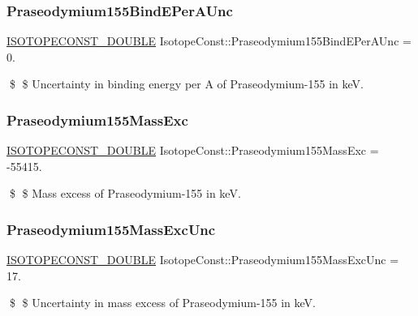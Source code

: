 \subsubsection{\texorpdfstring{Praseodymium155\+Bind\+E\+Per\+A\+Unc}{Praseodymium155BindEPerAUnc}}
{\footnotesize\ttfamily \mbox{\hyperlink{group___isotope_const-_macros_ga8f45a7272ce02c0b4c65c44636ed719a}{I\+S\+O\+T\+O\+P\+E\+C\+O\+N\+S\+T\+\_\+\+D\+O\+U\+B\+LE}} Isotope\+Const\+::\+Praseodymium155\+Bind\+E\+Per\+A\+Unc = 0.}

\$ \$ Uncertainty in binding energy per A of Praseodymium-\/155 in keV. \mbox{\label{group___isotope_const-_praseodymium-_pr155_ga29fab6d6cfc28d6984a22c2781a97644}} 
\subsubsection{\texorpdfstring{Praseodymium155\+Mass\+Exc}{Praseodymium155MassExc}}
{\footnotesize\ttfamily \mbox{\hyperlink{group___isotope_const-_macros_ga8f45a7272ce02c0b4c65c44636ed719a}{I\+S\+O\+T\+O\+P\+E\+C\+O\+N\+S\+T\+\_\+\+D\+O\+U\+B\+LE}} Isotope\+Const\+::\+Praseodymium155\+Mass\+Exc = -\/55415.}

\$ \$ Mass excess of Praseodymium-\/155 in keV. \mbox{\label{group___isotope_const-_praseodymium-_pr155_ga2dfcce1d413750dd22d34238c004101c}} 
\subsubsection{\texorpdfstring{Praseodymium155\+Mass\+Exc\+Unc}{Praseodymium155MassExcUnc}}
{\footnotesize\ttfamily \mbox{\hyperlink{group___isotope_const-_macros_ga8f45a7272ce02c0b4c65c44636ed719a}{I\+S\+O\+T\+O\+P\+E\+C\+O\+N\+S\+T\+\_\+\+D\+O\+U\+B\+LE}} Isotope\+Const\+::\+Praseodymium155\+Mass\+Exc\+Unc = 17.}

\$ \$ Uncertainty in mass excess of Praseodymium-\/155 in keV. \mbox{\label{group___isotope_const-_praseodymium-_pr155_gaeb4a6fae40dca3d866d3f0e50ba2350b}} 
